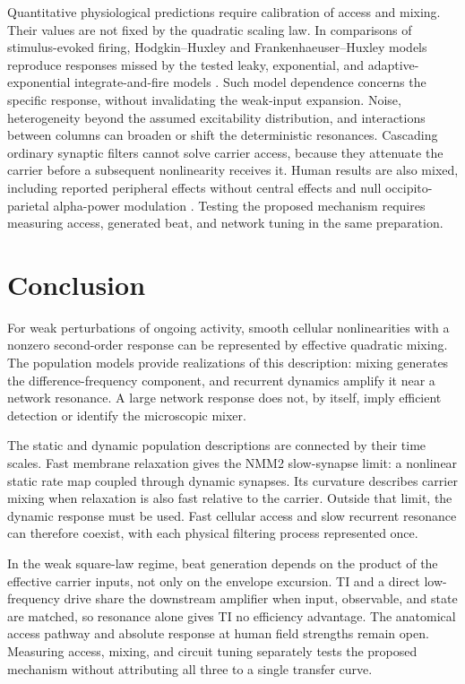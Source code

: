 \documentclass[11pt,a4paper]{article}
\begin{document}
Quantitative physiological predictions require calibration of access and mixing.
Their values are not fixed by the quadratic scaling law. In comparisons of
stimulus-evoked firing, Hodgkin--Huxley and Frankenhaeuser--Huxley models reproduce
responses missed by the tested leaky, exponential, and adaptive-exponential
integrate-and-fire models \cite{plovie2025}. Such model dependence concerns the
specific response, without invalidating the weak-input expansion. Noise,
heterogeneity beyond the assumed excitability distribution, and interactions
between columns can broaden or shift the deterministic resonances. Cascading
ordinary synaptic filters cannot solve carrier access, because they attenuate
the carrier before a subsequent nonlinearity receives it. Human results are also
mixed, including reported peripheral effects without central effects
\cite{iszak2023} and null occipito-parietal alpha-power modulation
\cite{mansourinezhad2025}. Testing the proposed mechanism requires measuring
access, generated beat, and network tuning in the same preparation.

\section{Conclusion}
For weak perturbations of ongoing activity, smooth cellular nonlinearities with a nonzero
second-order response can be represented by effective quadratic mixing. The
population models provide realizations of this description: mixing generates
the difference-frequency component, and recurrent dynamics amplify it near a
network resonance. A large network response does not, by itself, imply efficient
detection or identify the microscopic mixer.

The static and dynamic population descriptions are connected by their time scales.
Fast membrane relaxation gives the NMM2 slow-synapse limit: a nonlinear static rate
map coupled through dynamic synapses. Its curvature describes carrier mixing when
relaxation is also fast relative to the carrier. Outside that limit, the dynamic
response must be used. Fast cellular access and slow recurrent resonance can
therefore coexist, with each physical filtering process represented once.

In the weak square-law regime, beat generation depends on the product of the
effective carrier inputs, not only on the envelope excursion. TI and a direct
low-frequency drive share the downstream amplifier when input, observable, and
state are matched, so resonance alone gives TI no efficiency advantage. The
anatomical access pathway and absolute response at human field strengths remain
open. Measuring access, mixing, and circuit tuning separately tests the proposed
mechanism without attributing all three to a single transfer curve.
\end{document}
